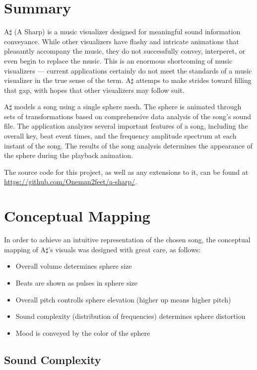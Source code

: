 \documentclass{article}
\begin{document}
\section{Summary}

A$\sharp$ (A Sharp) is a music visualizer designed for meaningful sound information conveyance. While other visualizers have flashy and intricate animations that pleasantly accompany the music, they do not successfully convey, interperet, or even begin to replace the music. This is an enormous shortcoming of music visualizers --- current applications certainly do not meet the standards of a music visualizer in the true sense of the term. A$\sharp$ attemps to make strides toward filling that gap, with hopes that other visualizers may follow suit.

A$\sharp$ models a song using a single sphere mesh. The sphere is animated through sets of transformations based on comprehensive data analysis of the song's sound file. The application analyzes several important features of a song, including the overall key, beat event times, and the frequency amplitude spectrum at each instant of the song. The results of the song analysis determines the appearance of the sphere during the playback animation.

The source code for this project, as well as any extensions to it, can be found at \url{https://github.com/Oneman2feet/a-sharp/}.

\section{Conceptual Mapping}

In order to achieve an intuitive representation of the chosen song, the conceptual mapping of A$\sharp$'s visuals was designed with great care, as follows:

\begin{itemize}
    \item Overall volume determines sphere size
    \item Beats are shown as pulses in sphere size
    \item Overall pitch controlls sphere elevation (higher up means higher pitch)
    \item Sound complexity (distribution of frequencies) determines sphere distortion
    \item Mood is conveyed by the color of the sphere
\end{itemize}

\subsection{Sound Complexity}
\end{document}
